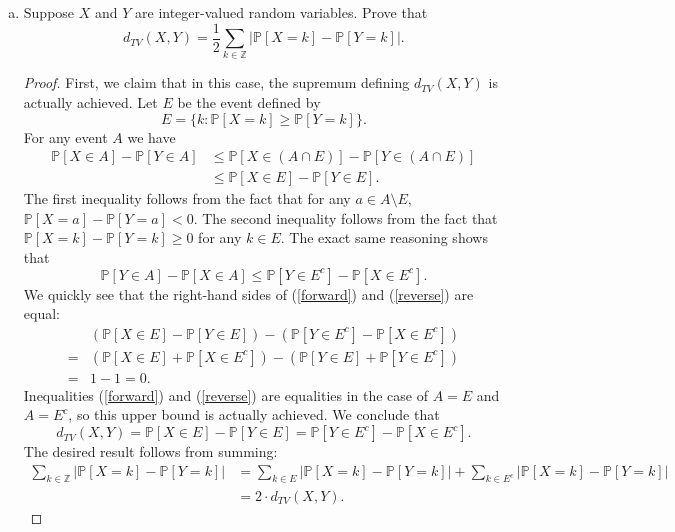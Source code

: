 \documentclass[11pt,letterpaper]{report}
\newcommand{\integers}{\mathbb{Z}}
\newcommand{\Prob}{\mathbb{P}}
\begin{document}
\begin{enumerate}[(a)]
	\item Suppose $X$ and $Y$ are integer-valued random variables. Prove that
	\[
	d_{TV}(X, Y) = \frac{1}{2}\sum_{k\in \integers}|\Prob[X = k] - \Prob[Y = k]|.
	\]
	\begin{proof}
		First, we claim that in this case, the supremum defining $d_{TV}(X,Y)$ is actually achieved. Let $E$ be the event defined by
		\[
		E = \{k: \Prob[X = k] \geq  \Prob[Y = k]\}.
		\]
		For any event $A$ we have
		\begin{equation}\label{forward}
		\begin{split}
			\Prob[X\in A]-\Prob[Y\in A] &\leq \Prob[X\in (A\cap E)] - \Prob[Y\in (A\cap E)]\\
			&\leq \Prob[X\in E] - \Prob[Y\in E].
		\end{split}
		\end{equation}
		The first inequality follows from the fact that for any $a\in A\setminus E$, $\Prob[X = a]-\Prob[Y=a]<0$. The second inequality follows from the fact that $\Prob[X=k]-\Prob[Y=k]\geq 0$ for any $k\in E$. The exact same reasoning shows that
		\begin{equation}\label{reverse}
		\Prob[Y\in A] - \Prob[X\in A] \leq \Prob[Y\in E^c] - \Prob[X\in E^c].
		\end{equation}
		We quickly see that the right-hand sides of (\ref{forward}) and (\ref{reverse}) are equal:
		\begin{align*}
			&(\Prob[X\in E] - \Prob[Y\in E]) - (\Prob[Y\in E^c] - \Prob[X\in E^c])\\
			=& (\Prob[X\in E] + \Prob[X\in E^c]) - (\Prob[Y\in E] + \Prob[Y\in E^c])\\
			=&1-1 = 0.
		\end{align*}
		Inequalities (\ref{forward}) and (\ref{reverse}) are equalities in the case of $A = E$ and $A = E^c$, so this upper bound is actually achieved. We conclude that
		\[
		d_{TV}(X,Y) = \Prob[X\in E] - \Prob[Y\in E] = \Prob[Y\in E^c] - \Prob[X\in E^c].
		\]
		The desired result follows from summing:
		\begin{align*}
			\sum_{k\in \integers}\big|\Prob[X=k]-\Prob[Y=k]\big| &= \sum_{k\in E}\big|\Prob[X=k]-\Prob[Y=k]\big| + \sum_{k\in E^c}\big|\Prob[X=k]-\Prob[Y=k]\big|\\
			&= 2\cdot d_{TV}(X,Y).
		\end{align*}
	\end{proof}
\end{enumerate}
\end{document}
